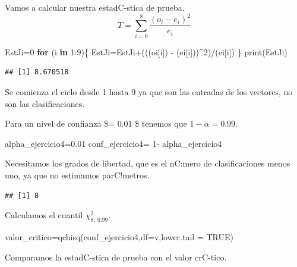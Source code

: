 \documentclass[
]{article}
\newenvironment{Shaded}{\begin{snugshade}}{\end{snugshade}}
\newcommand{\AttributeTok}[1]{\textcolor[rgb]{0.77,0.63,0.00}{#1}}
\newcommand{\ConstantTok}[1]{\textcolor[rgb]{0.00,0.00,0.00}{#1}}
\newcommand{\ControlFlowTok}[1]{\textcolor[rgb]{0.13,0.29,0.53}{\textbf{#1}}}
\newcommand{\DecValTok}[1]{\textcolor[rgb]{0.00,0.00,0.81}{#1}}
\newcommand{\FloatTok}[1]{\textcolor[rgb]{0.00,0.00,0.81}{#1}}
\newcommand{\FunctionTok}[1]{\textcolor[rgb]{0.00,0.00,0.00}{#1}}
\newcommand{\NormalTok}[1]{#1}
\newcommand{\OtherTok}[1]{\textcolor[rgb]{0.56,0.35,0.01}{#1}}
\newcommand{\SpecialCharTok}[1]{\textcolor[rgb]{0.00,0.00,0.00}{#1}}
\begin{document}
Vamos a calcular nuestra estadC-stica de prueba.
\[T= \sum _{i=0}^{8} \frac{(o_{i}-e_{i})^{2}}{e_{i}}\]

\begin{Shaded}
\begin{Highlighting}[]
\NormalTok{EstJi}\OtherTok{=}\DecValTok{0} 
\ControlFlowTok{for}\NormalTok{ (i }\ControlFlowTok{in} \DecValTok{1}\SpecialCharTok{:}\DecValTok{9}\NormalTok{)\{}
\NormalTok{  EstJi}\OtherTok{=}\NormalTok{EstJi}\SpecialCharTok{+}\NormalTok{(((oi[i]) }\SpecialCharTok{{-}}\NormalTok{ (ei[i]))}\SpecialCharTok{\^{}}\DecValTok{2}\NormalTok{)}\SpecialCharTok{/}\NormalTok{(ei[i])}
\NormalTok{\}}
\FunctionTok{print}\NormalTok{(EstJi)}
\end{Highlighting}
\end{Shaded}

\begin{verbatim}
## [1] 8.670518
\end{verbatim}

Se comienza el ciclo desde 1 hasta 9 ya que son las entradas de los
vectores, no son las clasificaciones.

Para un nivel de confianza \$\alpha = 0.01 \$ tenemos que
\(1-\alpha = 0.99\).

\begin{Shaded}
\begin{Highlighting}[]
\NormalTok{alpha\_ejercicio4}\OtherTok{=}\FloatTok{0.01}
\NormalTok{conf\_ejercicio4}\OtherTok{=} \DecValTok{1}\SpecialCharTok{{-}}\NormalTok{ alpha\_ejercicio4}
\end{Highlighting}
\end{Shaded}

Necesitamos los grados de libertad, que es el nC:mero de clasificaciones
menos uno, ya que no estimamos parC!metros.

\begin{verbatim}
## [1] 8
\end{verbatim}

Calculamos el cuantil \({\chi}^2_{8,\ 0.99}\).

\begin{Shaded}
\begin{Highlighting}[]
\NormalTok{valor\_critico}\OtherTok{=}\FunctionTok{qchisq}\NormalTok{(conf\_ejercicio4,}\AttributeTok{df=}\NormalTok{v,}\AttributeTok{lower.tail =} \ConstantTok{TRUE}\NormalTok{)}
\end{Highlighting}
\end{Shaded}

Comparamos la estadC-stica de prueba con el valor crC-tico.
\end{document}
